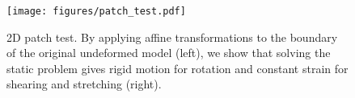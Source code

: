 

\begin{figure}[h]
  \texttt{[image: figures/patch\_test.pdf]}
  \caption{2D patch test. By applying affine transformations to the boundary of the original undeformed model (left), we show that solving the static problem gives rigid motion for rotation and constant strain for shearing and stretching (right).}
  \label{fig:patchtest}
\end{figure}

